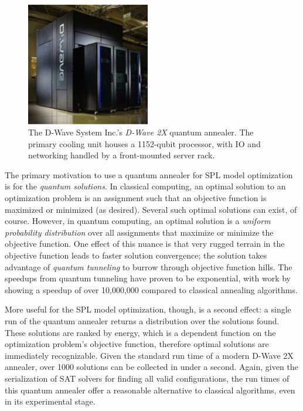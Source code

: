 \documentclass{sig-alternate-05-2015}
\begin{document}
\begin{figure}[!h]
\centering
\includegraphics[width=0.48\textwidth]{images/dwave}
\caption{The D-Wave System Inc.'s \emph{D-Wave 2X} quantum annealer. The primary cooling unit houses a 1152-qubit processor, with IO and networking handled by a front-mounted server rack.}
\label{figure:dwave}
\end{figure}

The primary motivation to use a quantum annealer for SPL model optimization is for the \emph{quantum solutions}. In classical computing, an optimal solution to an optimization problem is an assignment such that an objective function is maximized or minimized (as desired). Several such optimal solutions can exist, of course. However, in quantum computing, an optimal solution is a \emph{uniform probability distribution} over all assignments that maximize or minimize the objective function. One effect of this nuance is that very rugged terrain in the objective function leads to faster solution convergence; the solution takes advantage of \emph{quantum tunneling} to burrow through objective function hills. The speedups from quantum tunneling have proven to be exponential, with work by \cite{denchev2015computational} showing a speedup of over 10,000,000 compared to classical annealing algorithms.

More useful for the SPL model optimization, though, is a second effect: a single run of the quantum annealer returns a distribution over the solutions found. These solutions are ranked by energy, which is a dependent function on the optimization problem's objective function, therefore optimal solutions are immediately recognizable. Given the standard run time of a modern D-Wave 2X annealer, over 1000 solutions can be collected in under a second. Again, given the serialization of SAT solvers for finding all valid configurations, the run times of this quantum annealer offer a reasonable alternative to classical algorithms, even in its experimental stage.
\end{document}
